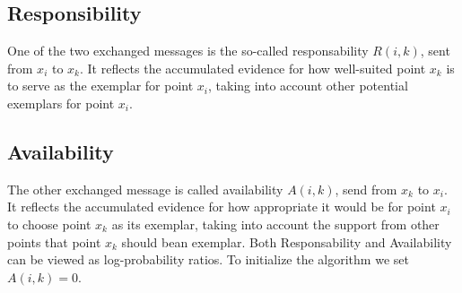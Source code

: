 \documentclass[11pt,a4paper]{article}
\begin{document}
\subsection{Responsibility}
One of the two exchanged messages is the so-called responsability $R(i,k)$, sent from $x_i$ to $x_k$. It reflects the accumulated evidence for how well-suited point $x_k$ is to serve as the exemplar for point $x_i$, taking into account other potential exemplars for point $x_i$.\cite{frey2007clustering}
\subsection{Availability}
The other exchanged message is called availability $A(i,k)$, send from $x_k$ to $x_i$. It reflects the accumulated evidence for how appropriate it would be for point $x_i$ to choose point $x_k$ as its exemplar, taking into account the support from other points that point $x_k$ should bean exemplar. Both Responsability and Availability can be viewed as log-probability ratios. To initialize the algorithm we set $A(i,k) = 0$.\cite{frey2007clustering}
\pagebreak
\end{document}
